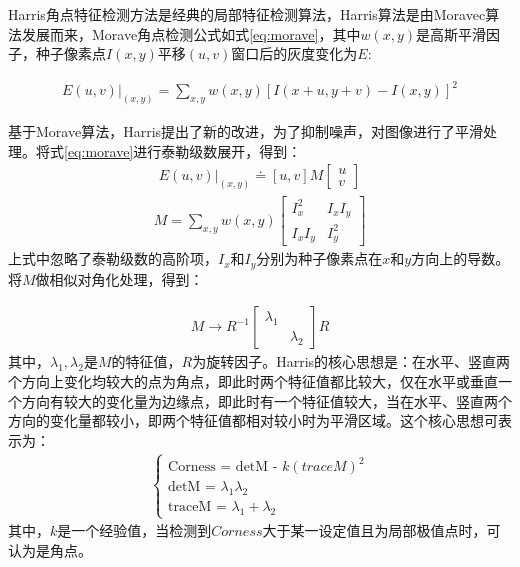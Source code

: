 Harris角点特征检测方法\cite{harris}是经典的局部特征检测算法，Harris算法是由Moravec\cite{moravec}算法发展而来，Morave角点检测公式如式\ref{eq:morave}，其中$w(x, y)$是高斯平滑因子，种子像素点$I(x, y)$平移$(u, v)$窗口后的灰度变化为$E$:

\begin{align}
E(u, v)|_{(x, y)} = \sum_{x, y}w(x, y)[I(x + u, y + v) - I(x, y)]^2 
\label{eq:morave}
\end{align}

基于Morave算法，Harris提出了新的改进，为了抑制噪声，对图像进行了平滑处理。将式\ref{eq:morave}进行泰勒级数展开，得到：
\begin{align}
E(u, v)|_{(x, y)} \doteq [u, v]M\left[ \begin{array}{l}
u \\
v
\end{array} \right]
\end{align}
\begin{align}
M = \sum_{x, y} w(x, y)\left[ \begin{array}{ll}
I_x^2 & I_xI_y\\
I_xI_y & I_y^2
\end{array} \right]
\end{align}
上式中忽略了泰勒级数的高阶项，$I_x$和$I_y$分别为种子像素点在$x$和$y$方向上的导数。将$M$做相似对角化处理，得到：

\begin{align}
M \to R^{-1}\left[ \begin{array}{ll}
\lambda_1 & \\
 & \lambda_2
\end{array} \right]R
\end{align}
其中，$\lambda_1, \lambda_2$是$M$的特征值，$R$为旋转因子。Harris的核心思想是：在水平、竖直两个方向上变化均较大的点为角点，即此时两个特征值都比较大，仅在水平或垂直一个方向有较大的变化量为边缘点，即此时有一个特征值较大，当在水平、竖直两个方向的变化量都较小，即两个特征值都相对较小时为平滑区域。这个核心思想可表示为：
\begin{align}
\left\{ \begin{array}{l}
\textrm{Corness = detM - $k(traceM)^2$} \\
\textrm{detM = $\lambda_1\lambda_2$} \\
\textrm{traceM = $\lambda_1 + \lambda_2$}
\end{array} \right.
\end{align}
其中，$k$是一个经验值，当检测到$Corness$大于某一设定值且为局部极值点时，可认为是角点。

